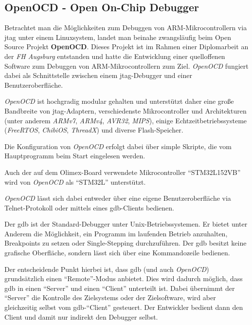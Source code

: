 \subsection{OpenOCD - Open On-Chip Debugger}
Betrachtet man die Möglichkeiten zum Debuggen von ARM-Mikrocontrollern via
\gls{jtag} unter einem Linuxsystem, landet man beinahe zwangsläufig beim Open
Source Projekt \textbf{OpenOCD}. Dieses Projekt ist im Rahmen einer
Diplomarbeit\cite{OOCD2} an der \emph{FH Augsburg} entstanden und hatte die
Entwicklung einer quelloffenen Software zum Debuggen von ARM-Mikrocontrollern zum Ziel.
\emph{OpenOCD} fungiert dabei als Schnittstelle zwischen einem \gls{jtag}-Debugger und
einer Benutzeroberfläche.

\emph{OpenOCD} ist hochgradig modular gehalten und unterstützt daher eine große
Bandbreite von \gls{jtag}-Adaptern, verschiedenste Mikrocontroller und
Architekturen (unter anderem \emph{ARMv7}, \emph{ARMv4}, \emph{AVR32},
\emph{MIPS}), einige Echtzeitbetriebssysteme (\emph{FreeRTOS}, \emph{ChibiOS},
\emph{ThreadX}) und diverse Flash-Speicher.

Die Konfiguration von \emph{OpenOCD} erfolgt dabei über simple Skripte, die vom
Hauptprogramm beim Start eingelesen werden.

Auch der auf dem Olimex-Board verwendete Mikrocontroller "`STM32L152VB"' wird
von \emph{OpenOCD} als "`STM32L"' unterstützt.

\emph{OpenOCD} lässt sich dabei entweder über eine eigene Benutzeroberfläche via
Telnet-Protokoll oder mittels eines \gls{gdb}-Clients bedienen.

\begin{definition}[GDB]
Der \gls{gdb} ist der Standard-Debugger unter
Unix-Betriebssystemen. Er bietet unter Anderem die Möglichkeit, ein Programm im
laufenden Betrieb anzuhalten, Breakpoints zu setzen oder Single-Stepping
durchzuführen. Der \gls{gdb} besitzt keine grafische Oberfläche, sondern
lässt sich über eine Kommandozeile bedienen.
\end{definition}

Der entscheidende Punkt hierbei ist, dass \gls{gdb} (und auch \emph{OpenOCD})
grundsätzlich einen "`Remote"'-Modus anbietet. Dies wird dadurch möglich, dass
\gls{gdb} in einen "`Server"' und einen "`Client"' unterteilt ist. Dabei
übernimmt der "`Server"' die Kontrolle des Zielsystems oder der Zielsoftware,
wird aber gleichzeitig selbst vom \gls{gdb}-"`Client"' gesteuert. Der Entwickler
bedient dann den Client und damit nur indirekt den Debugger selbst.

